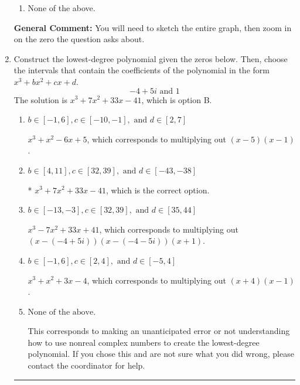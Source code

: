 \documentclass{extbook}[14pt]
\newcommand{\litem}[1]{\item #1

\rule{\textwidth}{0.4pt}}
\begin{document}
\begin{enumerate}
{\begin{enumerate}[label=\Alph*.]
\item None of the above.\end{enumerate}
\textbf{General Comment:} You will need to sketch the entire graph, then zoom in on the zero the question asks about.
}
\litem{
Construct the lowest-degree polynomial given the zeros below. Then, choose the intervals that contain the coefficients of the polynomial in the form $x^3+bx^2+cx+d$.
\[ -4 + 5 i \text{ and } 1 \]
The solution is \( x^{3} +7 x^{2} +33 x -41 \), which is option B.\begin{enumerate}[label=\Alph*.]
\item \( b \in [-1, 6], c \in [-10, -1], \text{ and } d \in [2, 7] \)

$x^{3} + x^{2} -6 x + 5$, which corresponds to multiplying out $(x -5)(x -1)$.
\item \( b \in [4, 11], c \in [32, 39], \text{ and } d \in [-43, -38] \)

* $x^{3} +7 x^{2} +33 x -41$, which is the correct option.
\item \( b \in [-13, -3], c \in [32, 39], \text{ and } d \in [35, 44] \)

$x^{3} -7 x^{2} +33 x + 41$, which corresponds to multiplying out $(x-(-4 + 5 i))(x-(-4 - 5 i))(x + 1)$.
\item \( b \in [-1, 6], c \in [2, 4], \text{ and } d \in [-5, 4] \)

$x^{3} + x^{2} +3 x -4$, which corresponds to multiplying out $(x + 4)(x -1)$.
\item \( \text{None of the above.} \)

This corresponds to making an unanticipated error or not understanding how to use nonreal complex numbers to create the lowest-degree polynomial. If you chose this and are not sure what you did wrong, please contact the coordinator for help.
\end{enumerate}

}
\end{enumerate}
\end{document}
